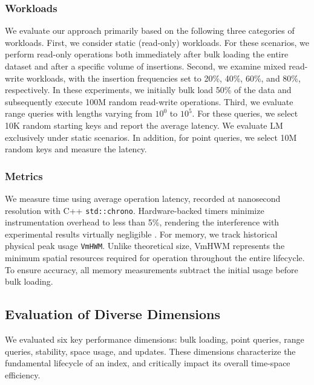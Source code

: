 \subsubsection{Workloads}
We evaluate our approach primarily based on the following three categories of workloads. First, we consider static (read-only) workloads. For these scenarios, we perform read-only operations both immediately after bulk loading the entire dataset and after a specific volume of insertions. Second, we examine mixed read-write workloads, with the insertion frequencies set to 20\%, 40\%, 60\%, and 80\%, respectively. In these experiments, we initially bulk load 50\% of the data and subsequently execute 100M random read-write operations. Third, we evaluate range queries with lengths varying from $10^0$ to $10^5$. For these queries, we select 10K random starting keys and report the average latency. We evaluate LM exclusively under static scenarios. In addition, for point queries, we select 10M random keys and measure the latency.

\subsubsection{Metrics}
We measure time using average operation latency, recorded at nanosecond resolution with C++ \texttt{std::chrono}. Hardware-backed timers minimize instrumentation overhead to less than 5\%, rendering the interference with experimental results virtually negligible \cite{paoloni2010, najafi2021systems}. For memory, we track historical physical peak usage \texttt{VmHWM}. Unlike theoretical size, VmHWM represents the minimum spatial resources required for operation throughout the entire lifecycle. To ensure accuracy, all memory measurements subtract the initial usage before bulk loading.

\subsection{Evaluation of Diverse Dimensions}
We evaluated six key performance dimensions: bulk loading, point queries, range queries, stability, space usage, and updates. These dimensions characterize the fundamental lifecycle of an index, and critically impact its overall time-space efficiency.

